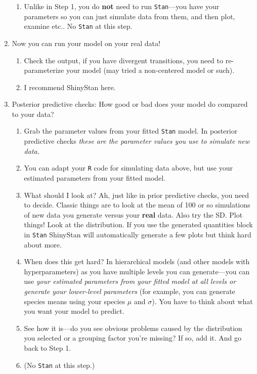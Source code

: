 \documentclass[11pt]{article}
\begin{document}
\begin{enumerate}
\begin{enumerate}
\item Unlike in Step 1, you do {\bf not} need to run \verb|Stan|---you have your parameters so you can just simulate data from them, and then plot, examine etc.. No \verb|Stan| at this step. 
\end{enumerate}
\item Now you can run your model on your real data!
\begin{enumerate}
\item Check the output, if you have divergent transitions, you need to re-parameterize your model (may tried a non-centered model or such).
\item I recommend ShinyStan here.
\end{enumerate}
\item Posterior predictive checks: How good or bad does your model do compared to your data?
\begin{enumerate}
\item Grab the parameter values from your fitted \verb|Stan| model. In posterior predictive checks \emph{these are the parameter values you use to simulate new data.}  
\item You can adapt your \verb|R| code for simulating data above, but use your estimated parameters from your fitted model. 
\item What should I look at? Ah, just like in prior predictive checks, you need to decide. Classic things are to look at the mean of 100 or so simulations of new data you generate versus your {\bf real} data. Also try the SD. Plot things! Look at the distribution. If you use the generated quantities block in \verb|Stan| ShinyStan will automatically generate a few plots but think hard about more.
\item When does this get hard? In hierarchical models (and other models with hyperparameters) as you have multiple levels you can generate---you can use \emph{your estimated parameters from your fitted model at all levels or generate your lower-level parameters} (for example, you can generate species means using your species $\mu$ and $\sigma$). You have to think about what you want your model to predict.
\item See how it is---do you see obvious problems caused by the distribution you selected or a grouping factor you're missing? If so, add it. And go back to Step 1. 
\item (No \verb|Stan| at this step.)
\end{enumerate}
\end{enumerate}
\end{document}
